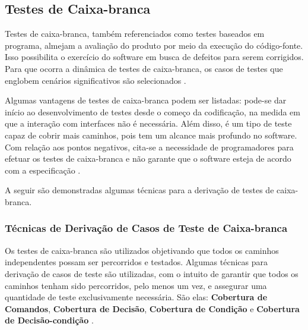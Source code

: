 \subsection{Testes de Caixa-branca}
Testes de caixa-branca, também referenciados como testes baseados em programa,
almejam a avaliação do produto por meio da execução do código-fonte. Isso
possibilita o exercício do software em busca de defeitos para serem corrigidos.
Para que ocorra a dinâmica de testes de caixa-branca, os casos de testes que
englobem cenários significativos são selecionados \cite{barbosaEtAl2009}.
\par
\indent Algumas vantagens de testes de caixa-branca podem ser listadas: pode-se
dar início ao desenvolvimento de testes desde o começo da codificação, na
medida em que a interação com interfaces não é necessária. Além disso, é um
tipo de teste capaz de cobrir mais caminhos, pois tem um alcance mais profundo
no software. Com relação aos pontos negativos, cita-se a necessidade de
programadores para efetuar os testes de caixa-branca e não garante que o software esteja de acordo com a especificação  \cite{barbosaEtAl2009}.
\par
\indent A seguir são demonstradas algumas técnicas para a derivação de testes
de caixa-branca.

\subsubsection{Técnicas de Derivação de Casos de Teste de Caixa-branca}
Os testes de caixa-branca são utilizados objetivando que todos os caminhos
independentes possam ser percorridos e testados. Algumas técnicas para
derivação de casos de teste são utilizadas, com o intuito de garantir que todos
os caminhos tenham sido percorridos, pelo menos um vez, e assegurar uma
quantidade de teste exclusivamente necessária. São elas:
\textbf{Cobertura de Comandos}, \textbf{Cobertura de Decisão},
\textbf{Cobertura de Condição} e \textbf{Cobertura de Decisão-condição}
\cite{myers2004}.

